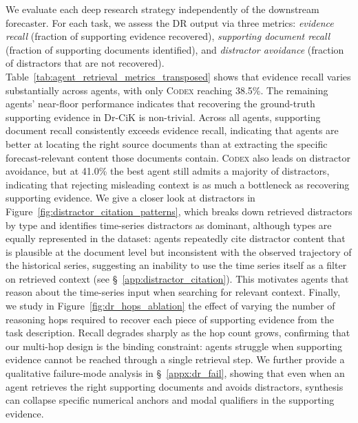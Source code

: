 \documentclass[]{servicenow}
\begin{document}
We evaluate each deep research strategy independently of the downstream forecaster. 
For each task, we assess the DR output via three metrics: \emph{evidence recall} (fraction of supporting evidence recovered), \emph{supporting document recall} (fraction of supporting documents identified), and \emph{distractor avoidance} (fraction of distractors that are not recovered).
Table~\ref{tab:agent_retrieval_metrics_transposed} shows that evidence recall varies substantially across agents, with only \textsc{Codex} reaching 38.5\%. 
The remaining agents' near-floor performance indicates that recovering the ground-truth supporting evidence in Dr-CiK is non-trivial.
Across all agents, supporting document recall consistently exceeds evidence recall, indicating that agents are better at locating the right source documents than at extracting the specific forecast-relevant content those documents contain. 
\textsc{Codex} also leads on distractor avoidance, but at 41.0\% the best agent still admits a majority of distractors, indicating that rejecting misleading context is as much a bottleneck as recovering supporting evidence.
We give a closer look at distractors in Figure~\ref{fig:distractor_citation_patterns}, which breaks down retrieved distractors by type and identifies time-series distractors as dominant, although types are equally represented in the dataset: 
agents repeatedly cite distractor content that is plausible at the document level but inconsistent with the observed trajectory of the historical series, suggesting an inability to use the time series itself as a filter on retrieved context (see \S~\ref{app:distractor_citation}).
This motivates agents that reason about the time-series input when searching for relevant context.
Finally, we study in Figure~\ref{fig:dr_hops_ablation} the effect of varying the number of reasoning hops required to recover each piece of supporting evidence from the task description. Recall degrades sharply as the hop count grows, confirming that our multi-hop design is the binding constraint: agents struggle when supporting evidence cannot be reached through a single retrieval step. We further provide a qualitative failure-mode analysis in \S~\ref{appx:dr_fail}, showing that even when an agent retrieves the right supporting documents and avoids distractors, synthesis can collapse specific numerical anchors and modal qualifiers in the supporting evidence.
\end{document}
